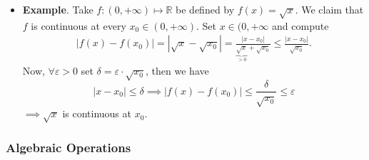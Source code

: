 \documentclass{article}
\newcommand{\R}{\mathbb{R}}
\newcommand{\?}{\stackrel{?}{=}}
\theoremstyle{definition} %
\begin{document}
\begin{itemize}
\begin{proof}
    \end{proof}
    \item \textbf{Example}. Take $f: (0, +\infty) \mapsto \R$ be defined by $f(x) = \sqrt{x}$. We claim that $f$ is continuous at every $x_0 \in (0, +\infty)$. Set $x \in (0, +\infty$ and compute
    \begin{align*}
        |f(x) - f(x_0)| = |\sqrt{x} - \sqrt{x_0}| = \frac{|x - x_0|}{\underbrace{\sqrt{x}}_{> 0} + \sqrt{x_0}} \leq \frac{|x - x_0|}{\sqrt{x_0}}.
    \end{align*}
    Now, $\forall \varepsilon > 0$ set $\delta = \varepsilon \cdot \sqrt{x_0}$, then we have
    $$|x - x_0| \leq \delta \implies |f(x) - f(x_0)| \leq \frac{\delta}{\sqrt{x_0}} \leq \varepsilon$$
    $\implies \sqrt{x}$ is continuous at $x_0$.
\end{itemize}

\subsubsection{Algebraic Operations}
\end{document}
